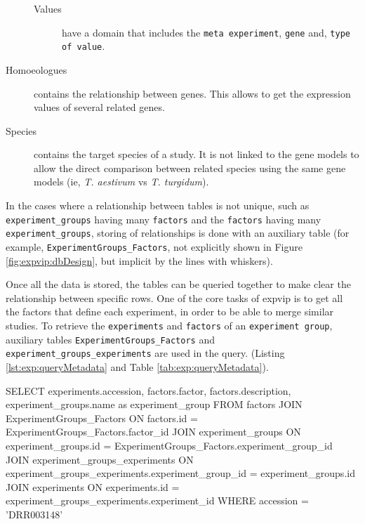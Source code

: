 \begin{description}
\begin{description}
\item[Values] have a domain that includes the \texttt{meta experiment}, \texttt{gene} and, \texttt{type of value}.
\end{description}
\item[Homoeologues] contains the relationship between genes. This allows to get the expression values of several related genes. 
\item[Species] contains the target species of a study. It is not linked to the gene models to allow the direct comparison between related species using the same gene models (ie, \textit{T. aestivum} vs \textit{T. turgidum}). 
\end{description}

In the cases where a relationship between tables is not unique, such as \texttt{experiment\_groups} having many \texttt{factors} and the \texttt{factors} having many \texttt{experiment\_groups}, storing of relationships is done with an auxiliary table (for example, \texttt{ExperimentGroups\_Factors}, not explicitly shown in Figure \ref{fig:expvip:dbDesign}, but implicit by the lines with whiskers). 

Once all the data is stored, the tables can be queried together to make clear the relationship between specific rows. 
One of the core tasks of \gls{expvip} is to get all the factors that define each experiment, in order to be able to merge similar studies. 
To retrieve the \texttt{experiments} and \texttt{factors} of an \texttt{experiment group}, auxiliary tables \texttt{ExperimentGroups\_Factors}  and \texttt{experiment\_groups\_experiments} are used in the query. (Listing \ref{lst:exp:queryMetadata} and Table \ref{tab:exp:queryMetadata}).


\begin{code}[language=sql, caption={[Query experiments and factors]Query experiments and factorsQuery experiments and factors from accession 'DRR003148'},label=lst:exp:queryMetadata]
SELECT
	experiments.accession,  
	factors.factor,
	factors.description, 
	experiment_groups.name as experiment_group 
FROM factors 
JOIN ExperimentGroups_Factors 
	ON factors.id = ExperimentGroups_Factors.factor_id
JOIN experiment_groups 
	ON experiment_groups.id = ExperimentGroups_Factors.experiment_group_id
JOIN experiment_groups_experiments 
	ON experiment_groups_experiments.experiment_group_id = experiment_groups.id
JOIN experiments 
	ON experiments.id = experiment_groups_experiments.experiment_id
WHERE accession =  'DRR003148'
\end{code}

